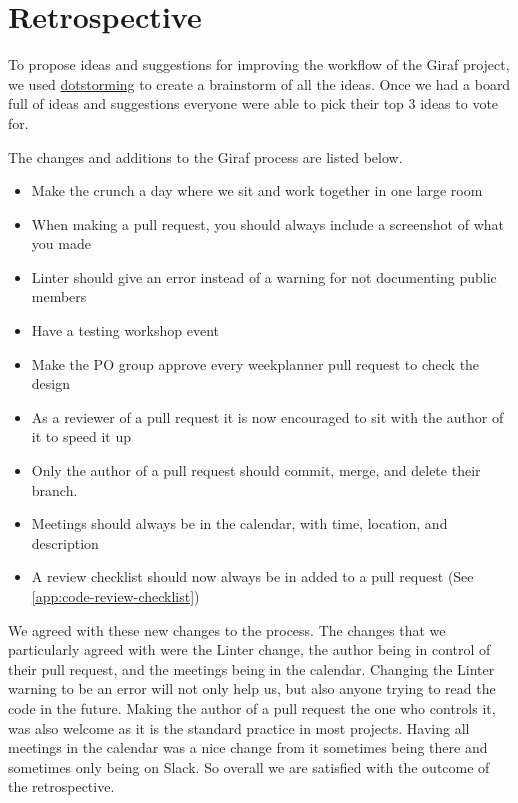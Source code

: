\section{Retrospective}
To propose ideas and suggestions for improving the workflow of the Giraf project, we used \href{https://dotstorming.com/}{dotstorming} to create a brainstorm of all the ideas. 
Once we had a board full of ideas and suggestions everyone were able to pick their top 3 ideas to vote for.

The changes and additions to the Giraf process are listed below.

\begin{itemize}
  \item Make the crunch a day where we sit and work together in one large room
  \item When making a pull request, you should always include a screenshot of what you made
  \item Linter should give an error instead of a warning for not documenting public members
  \item Have a testing workshop event
  \item Make the PO group approve every weekplanner pull request to check the design
  \item As a reviewer of a pull request it is now encouraged to sit with the author of it to speed it up
  \item Only the author of a pull request should commit, merge, and delete their branch.
  \item Meetings should always be in the calendar, with time, location, and description
  \item A review checklist should now always be in added to a pull request (See \autoref{app:code-review-checklist})
\end{itemize}

We agreed with these new changes to the process.
The changes that we particularly agreed with were the Linter change, the author being in control of their pull request, and the meetings being in the calendar.
Changing the Linter warning to be an error will not only help us, but also anyone trying to read the code in the future.
Making the author of a pull request the one who controls it, was also welcome as it is the standard practice in most projects.
Having all meetings in the calendar was a nice change from it sometimes being there and sometimes only being on Slack.
So overall we are satisfied with the outcome of the retrospective.
